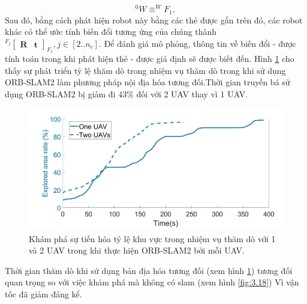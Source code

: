 \documentclass[11pt,openany]{book}
\begin{document}
\begin{equation}\label{eq:3.9}
    ^0W\equiv ^WF_1,
\end{equation}
Sau đó, bằng cách phát hiện robot này bằng các thẻ được gắn trên đó, các robot khác có thể ước tính biến đổi tương ứng của chúng thành $^{F_j}\begin{bmatrix}\mathbf{R} & \mathbf{t}\end{bmatrix}_{F_1}, j \in [2..n_c]$. Để đánh giá mô phỏng, thông tin về biến đổi - được tính toán trong khi phát hiện thẻ - được giả định sẽ được biết đến. Hình \ref{fig:3.24} cho thấy sự phát triển tỷ lệ thăm dò trong nhiệm vụ thăm dò trong khi sử dụng ORB-SLAM2 làm phương pháp nội địa hóa tương đối.Thời gian truyền bá sử dụng ORB-SLAM2 bị giảm đi $43\%$ đối với 2 UAV thay vì 1 UAV.
\begin{figure}[H]
    \centering
    \includegraphics[scale=0.4]{assets/3_24.png}
    \caption{Khám phá sự tiến hóa tỷ lệ khu vực trong nhiệm vụ thăm dò với 1 và 2 UAV trong khi thực hiện ORB-SLAM2 bởi mỗi UAV.}
    \label{fig:3.24}
\end{figure}
Thời gian thăm dò khi sử dụng bản địa hóa tương đối (xem hình \ref{fig:3.24}) tương đối quan trọng so với việc khám phá mà không có slam (xem hình \ref{fig:3.18}) Vì vận tốc đã giảm đáng kể.
\end{document}
